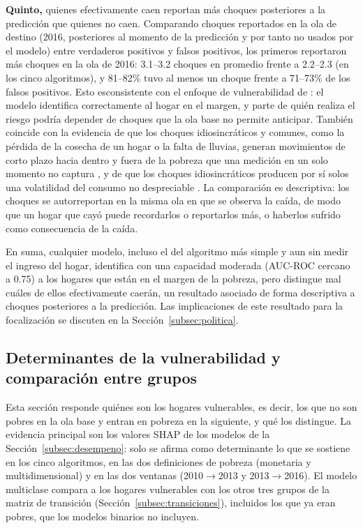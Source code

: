 \documentclass[12pt, letterpaper]{article}
\begin{document}
\textbf{Quinto,} quienes efectivamente caen reportan más choques
posteriores a la predicción que quienes no caen. Comparando choques reportados en la ola de
destino (2016, posteriores al momento de la predicción y por tanto no
usados por el modelo) entre verdaderos positivos y falsos positivos, los
primeros reportaron más choques en la ola de 2016: 3.1--3.2
choques en promedio frente a 2.2--2.3 (en los cinco algoritmos), y 81--82\% tuvo al
menos un choque frente a 71--73\% de los falsos positivos. Esto esconsistente
con el enfoque de vulnerabilidad de \textcite{chaudhuri2002}: el modelo
identifica correctamente al hogar en el margen, y parte de quién realiza
el riesgo podría depender de choques que la ola base no permite
anticipar. También coincide con la evidencia de que los choques
idiosincráticos y comunes, como la pérdida de la cosecha de un hogar o la
falta de lluvias, generan movimientos de corto plazo hacia dentro y fuera
de la pobreza que una medición en un solo momento no captura
\parencite{dercon2000}, y de que los choques idiosincráticos producen por
sí solos una volatilidad del consumo no despreciable
\parencite{christiaensen2005}. La comparación es descriptiva: los choques se autorreportan en
la misma ola en que se observa la caída, de modo que un hogar que cayó
puede recordarlos o reportarlos más, o haberlos sufrido como consecuencia
de la caída.

En suma, cualquier modelo, incluso el del algoritmo más simple y aun sin medir el
ingreso del hogar, identifica con una capacidad moderada (AUC-ROC cercano
a 0.75) a los hogares que están en el margen de la pobreza, pero distingue
mal cuáles de ellos efectivamente caerán, un resultado asociado de forma
descriptiva a choques posteriores a la predicción. Las
implicaciones de este resultado para la focalización se discuten en la
Sección~\ref{subsec:politica}.

\subsection{Determinantes de la vulnerabilidad y comparación entre grupos}
\label{subsec:determinantes}
\label{subsec:caracterizacion_grupos}
\label{subsec:importancia_resultados}

Esta sección responde quiénes son los hogares vulnerables, es decir, los
que no son pobres en la ola base y entran en pobreza en la siguiente, y
qué los distingue. La evidencia principal son los valores SHAP de los
modelos de la Sección~\ref{subsec:desempeno}: solo se afirma como
determinante lo que se sostiene en los cinco algoritmos, en las dos
definiciones de pobreza (monetaria y multidimensional) y en las dos
ventanas (2010$\to$2013 y 2013$\to$2016). El modelo multiclase compara a
los hogares vulnerables con los otros tres grupos de la matriz de
transición (Sección~\ref{subsec:transiciones}), incluidos los que ya eran
pobres, que los modelos binarios no incluyen.
\end{document}
